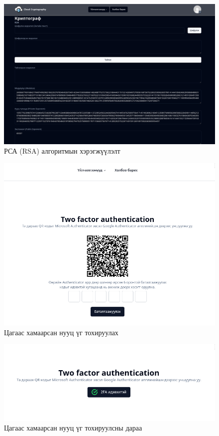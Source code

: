 \begin{figure}[h]
	\centering
	\includegraphics[scale=0.35]{assets/web/rsa.png}
	\caption{РСА (RSA) алгоритмын хэрэгжүүлэлт}
	\label{fig:architecture}
\end{figure}

\begin{figure}[h]
	\centering
	\includegraphics[scale=0.55]{assets/web/2fa.png}
	\caption{Цагаас хамаарсан нууц үг тохируулах}
	\label{fig:architecture}
\end{figure}
\begin{figure}[h]
	\centering
	\includegraphics[scale=0.65]{assets/web/2faconfirm.png}
	\caption{Цагаас хамаарсан нууц үг тохируулсны дараа}
	\label{fig:architecture}
\end{figure}
